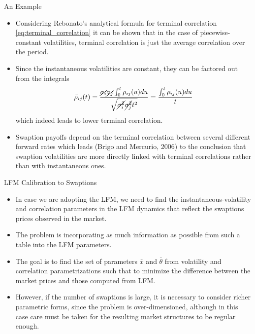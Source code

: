 \documentclass{beamer}
\begin{document}
\begin{frame}{An Example}
\begin{itemize}
	\item<1-> Considering Rebonato's analytical formula for terminal correlation \cref{eq:terminal_correlation} it can be shown that in the case of piecewise-constant volatilities, terminal correlation is just the average correlation over the period. 
  	\item<2-> Since the instantaneous volatilities are constant, they can be factored out from the integrals
	  \begin{equation*}	    \tilde{\rho}_{ij}(t)=\frac{\cancel{\sigma_i}\cancel{\sigma_j}\int_0^t\rho_{ij}(u)du}{\sqrt{\cancel{\sigma_i^2}\cancel{\sigma_j^2} t^2}}= \frac{\int_0^t\rho_{ij}(u)du}{t}		
  	\end{equation*}
  	which indeed leads to lower terminal correlation.
  	\item<3-> Swaption payoffs depend on the terminal correlation between several different forward rates which leads (Brigo and Mercurio, 2006) to the conclusion that swaption volatilities are more directly linked with terminal correlations rather than with instantaneous ones.
  \end{itemize}
\end{frame}

\begin{frame}{LFM Calibration to Swaptions}
\begin{itemize}
\item In case we are adopting the LFM, we need to find the instantaneous-volatility and correlation parameters in the LFM dynamics that reflect the swaptions prices observed in the market.

\item The problem is incorporating as much information as possible from such a table into the LFM parameters. 
\item The goal is to find the set of parameters $\bar{x}$ and $\bar{\theta}$ from volatility and correlation parametrizations such that to minimize the difference between the market prices and those computed from LFM.
\item However, if the number of swaptions is large, it is necessary to consider richer parametric forms, since the problem is over-dimensioned, although in this case care must be taken for the resulting market structures to be regular enough.
\end{itemize}
\end{frame}
\end{document}
